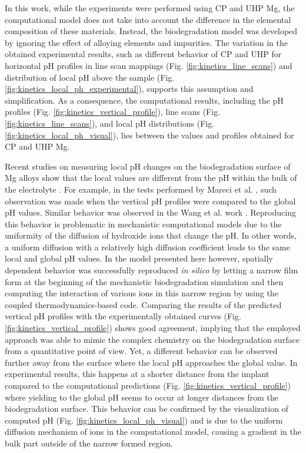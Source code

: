 In this work, while the experiments were performed using \gls{CP} and \gls{UHP} Mg, the computational model does not take into account the difference in the elemental composition of these materials. Instead, the biodegradation model was developed by ignoring the effect of alloying elements and impurities. The variation in the obtained experimental results, such as different behavior of \gls{CP} and \gls{UHP} for horizontal pH profiles in line scan mappings (Fig. \ref{fig:kinetics_line_scans}) and distribution of local pH above the sample (Fig. \ref{fig:kinetics_local_ph_experimental}), supports this assumption and simplification. As a consequence, the computational results, including the pH profiles (Fig. \ref{fig:kinetics_vertical_profile}), line scans (Fig. \ref{fig:kinetics_line_scans}), and local pH distributions (Fig. \ref{fig:kinetics_local_ph_visual}), lies between the values and profiles obtained for \gls{CP} and \gls{UHP} Mg.

Recent studies on measuring local pH changes on the biodegradation surface of Mg alloys show that the local values are different from the pH within the bulk of the electrolyte \cite{Gonzalez2021}. For example, in the tests performed by Mareci et al. \cite{Mareci2016}, such observation was made when the vertical pH profiles were compared to the global pH values. Similar behavior was observed in the Wang et al. work \cite{Wang2022}. Reproducing this behavior is problematic in mechanistic computational models due to the uniformity of the diffusion of hydroxide ions that change the pH. In other words, a uniform diffusion with a relatively high diffusion coefficient leads to the same local and global pH values. In the model presented here however, spatially dependent  behavior was successfully reproduced \textit{in silico} by letting a narrow film form at the beginning of the mechanistic biodegradation simulation and then computing the interaction of various ions in this narrow region by using the coupled thermodynamics-based code. Comparing the results of the predicted vertical pH profiles with the experimentally obtained curves (Fig. \ref{fig:kinetics_vertical_profile}) shows good agreement, implying that the employed approach was able to mimic the complex chemistry on the biodegradation surface from a quantitative point of view. Yet, a different behavior can be observed further away from the surface where the local pH approaches the global value. In experimental results, this happens at a shorter distance from the implant compared to the computational predictions (Fig. \ref{fig:kinetics_vertical_profile}) where yielding to the global pH seems to occur at longer distances from the biodegradation surface. This behavior can be confirmed by the visualization of computed pH (Fig. \ref{fig:kinetics_local_ph_visual}) and is due to the uniform diffusion mechanism of ions in the computational model, causing a gradient in the bulk part outside of the narrow formed region.

